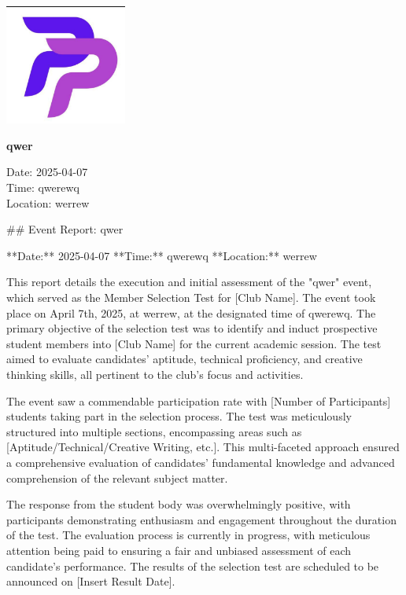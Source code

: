 \documentclass{article}
\begin{document}
\begin{center}
    \includegraphics[width=0.3\textwidth]{logo.png}
    \vspace{0.5cm}

   \LARGE \textbf{qwer}

    \vspace{0.3cm}
    \normalsize Date: 2025-04-07 \\
    Time: qwerewq \\
    Location: werrew
\end{center}

\vspace{1cm}

\#\# Event Report: qwer

**Date:** 2025-04-07
**Time:** qwerewq
**Location:** werrew

This report details the execution and initial assessment of the "qwer" event, which served as the Member Selection Test for [Club Name]. The event took place on April 7th, 2025, at werrew, at the designated time of qwerewq. The primary objective of the selection test was to identify and induct prospective student members into [Club Name] for the current academic session. The test aimed to evaluate candidates' aptitude, technical proficiency, and creative thinking skills, all pertinent to the club's focus and activities.

The event saw a commendable participation rate with [Number of Participants] students taking part in the selection process. The test was meticulously structured into multiple sections, encompassing areas such as [Aptitude/Technical/Creative Writing, etc.]. This multi-faceted approach ensured a comprehensive evaluation of candidates' fundamental knowledge and advanced comprehension of the relevant subject matter.

The response from the student body was overwhelmingly positive, with participants demonstrating enthusiasm and engagement throughout the duration of the test. The evaluation process is currently in progress, with meticulous attention being paid to ensuring a fair and unbiased assessment of each candidate's performance. The results of the selection test are scheduled to be announced on [Insert Result Date].
\end{document}
